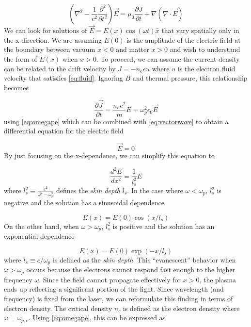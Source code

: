 \begin{equation}
	(\nabla^2 - \frac{1}{c^2} \frac{\partial^2}{\partial t^2}) \vec{E} = \mu_0 \frac{\partial J}{\partial t} + \nabla(\nabla \cdot \vec{E}) \label{eq:vectorwave}
\end{equation}
We can look for solutions of $\vec{E} = E(x) \cos(\omega t) \hat{x}$ that vary spatially only in the x direction. We are assuming $E(0)$ is the amplitude of the electric field at the boundary between vacuum $x < 0$ and matter $x > 0$ and wish to understand the form of $E(x)$ when $x > 0$. To proceed, we can assume the current density can be related to the drift velocity\cite{Macchi_2013_Plasma} by $J = -n_e e u$ where $u$ is the electron fluid velocity that satisfies \cref{eq:fluid}. Ignoring $B$ and thermal pressure, this relationship becomes 

\begin{equation}
	\frac{\partial \vec{J}}{\partial t} = \frac{n_e e^2}{m} E = \omega_p^2 \epsilon_0 \vec{E}
\end{equation}
using \cref{eq:omegape} which can be combined with \cref{eq:vectorwave} to obtain a differential equation for the electric field

\begin{equation}
	[\nabla^2 + \frac{\omega^2}{c^2}(1 - \frac{\omega_p^2}{\omega^2})] \vec{E} = 0
\end{equation}
By just focusing on the x-dependence, we can simplify this equation to 

\begin{equation}
	\frac{d^2 E}{d x^2} = \frac{1}{l_s^2}  E
\end{equation}
where $l_s^2 \equiv \frac{c^2}{\omega^2 - \omega_p^2}$ defines the \emph{skin depth} $l_s$. In the case where $\omega < \omega_p$, $l_s^2$ is negative and the solution has a sinusoidal dependence

\begin{equation}
	E(x) = E(0) \cos(x / l_s)
\end{equation}
On the other hand, when $\omega > \omega_p$, $l_s^2$ is positive and the solution has an exponential dependence

\begin{equation}
	E(x) = E(0) \exp(-x / l_s)
\end{equation}
where $l_s \equiv c / \omega_p$ is defined as the \emph{skin depth}. This ``evanescent'' behavior when $\omega > \omega_p$ occurs because the electrons cannot respond fast enough to the higher frequency $\omega$. Since the field cannot propagate effectively for $x > 0$, the plasma ends up reflecting a significant portion of the light. Since wavelength (and frequency) is fixed from the laser, we can reformulate this finding in terms of electron density. The critical density $n_c$ is defined as the electron density where $\omega = \omega_{p,e}$. Using \cref{eq:omegape}, this can be expressed as

